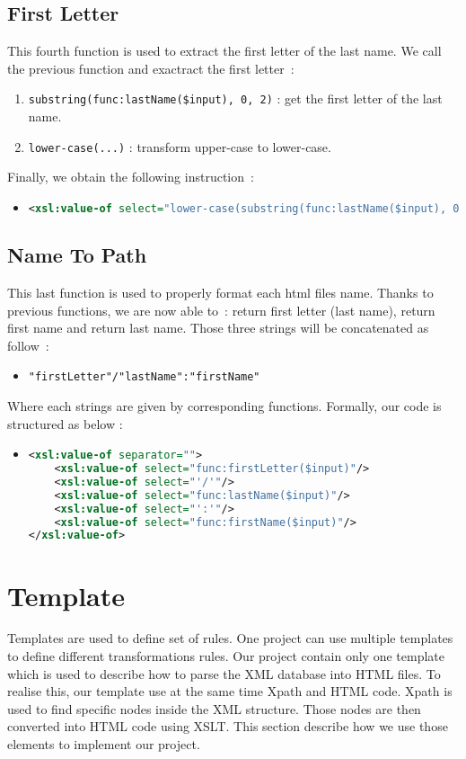\documentclass{article}
\begin{document}
  \subsection{First Letter}
    This fourth function is used to extract the first letter of the last name. We call the previous function and exactract the first letter~:
    \begin{enumerate}
      \item \verb|substring(func:lastName($input), 0, 2)| : get the first letter of the last name.
      \item \verb|lower-case(...)| : transform upper-case to lower-case.
    \end{enumerate}
    Finally, we obtain the following instruction~:
    \begin{itemize}
      \item \begin{lstlisting}[language=XML]
<xsl:value-of select="lower-case(substring(func:lastName($input), 0, 2))" />\end{lstlisting}
    \end{itemize}

  \subsection{Name To Path} 
    This last function is used to properly format each html files name. Thanks to previous functions, we are now able to~: return first letter (last name), return first name and return last name. Those three strings will be concatenated as follow~: 
    \begin{itemize}
      \item \verb|"firstLetter"/"lastName":"firstName"|
    \end{itemize}
    Where each strings are given by corresponding functions. Formally, our code is structured as below : 
    \begin{itemize}
    \item \begin{lstlisting}[language=XML]
<xsl:value-of separator="">
    <xsl:value-of select="func:firstLetter($input)"/>
    <xsl:value-of select="'/'"/>
    <xsl:value-of select="func:lastName($input)"/>
    <xsl:value-of select="':'"/>
    <xsl:value-of select="func:firstName($input)"/>
</xsl:value-of>\end{lstlisting}
    \end{itemize}

\section{Template}
  Templates are used to define set of rules. One project can use multiple templates to define different transformations rules. Our project contain only one template which is used to describe how to parse the XML database into HTML files. To realise this, our template use at the same time Xpath and HTML code. Xpath is used to find specific nodes inside the XML structure. Those nodes are then converted into HTML code using XSLT. This section describe how we use those elements to implement our project.
\end{document}
